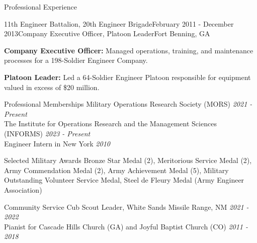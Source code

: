 \documentclass[
	11pt,
]{resume}
\begin{document}
\begin{rSection}{Professional Experience}
\begin{minipage}{\linewidth}
	\begin{rSubsection}{11th Engineer Battalion, 20th Engineer Brigade}{February 2011 - December 2013}{Company Executive Officer, Platoon Leader}{Fort Benning, GA}
		\item \textbf{Company Executive Officer:} Managed operations, training, and maintenance processes for a 198-Soldier Engineer Company.
		\item \textbf{Platoon Leader:} Led a 64-Soldier Engineer Platoon responsible for equipment valued in excess of \$20 million.
	\end{rSubsection}
\end{minipage}

\end{rSection}

\begin{rSection}{Professional Memberships}	
    Military Operations Research Society (MORS) \hfill \textit{2021 - Present} \\
    The Institute for Operations Research and the Management Sciences (INFORMS) \hfill \textit{2023 - Present} \\
    Engineer Intern in New York \hfill \textit{2010}
\end{rSection}

\begin{rSection}{Selected Military Awards}
    Bronze Star Medal (2), Meritorious Service Medal (2), Army Commendation Medal (2), Army Achievement Medal (5), Military Outstanding Volunteer Service Medal, Steel de Fleury Medal (Army Engineer Association)
\end{rSection}

\begin{rSection}{Community Service}
    Cub Scout Leader, White Sands Missile Range, NM \hfill \textit{2021 - 2022} \\
    Pianist for Cascade Hills Church (GA) and Joyful Baptist Church (CO) \hfill \textit{2011 - 2018}
\end{rSection}
\end{document}
